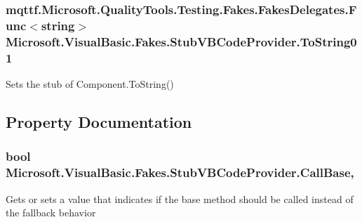 \hypertarget{class_microsoft_1_1_visual_basic_1_1_fakes_1_1_stub_v_b_code_provider_aeae405a921a2a8bb3214802f9881e976}{
\subsubsection[{To\-String01}]{\setlength{\rightskip}{0pt plus 5cm}mqttf.\-Microsoft.\-Quality\-Tools.\-Testing.\-Fakes.\-Fakes\-Delegates.\-Func$<$string$>$ Microsoft.\-Visual\-Basic.\-Fakes.\-Stub\-V\-B\-Code\-Provider.\-To\-String01}}\label{class_microsoft_1_1_visual_basic_1_1_fakes_1_1_stub_v_b_code_provider_aeae405a921a2a8bb3214802f9881e976}


Sets the stub of Component.\-To\-String()



\subsection{Property Documentation}
\hypertarget{class_microsoft_1_1_visual_basic_1_1_fakes_1_1_stub_v_b_code_provider_a251223f37d77b0de8c6013cf45fceac9}{
\subsubsection[{Call\-Base}]{\setlength{\rightskip}{0pt plus 5cm}bool Microsoft.\-Visual\-Basic.\-Fakes.\-Stub\-V\-B\-Code\-Provider.\-Call\-Base\hspace{0.3cm}{\ttfamily [get]}, {\ttfamily [set]}}}\label{class_microsoft_1_1_visual_basic_1_1_fakes_1_1_stub_v_b_code_provider_a251223f37d77b0de8c6013cf45fceac9}


Gets or sets a value that indicates if the base method should be called instead of the fallback behavior

